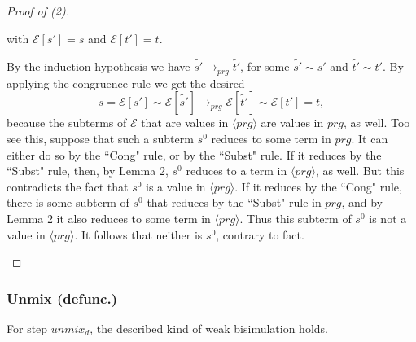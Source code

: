\documentclass[11pt]{article} %
\begin{document}
\begin{proof}[Proof of (2)]
\begin{enumerate}
with $\mathcal{E}[s'] = s$ and $\mathcal{E}[t'] = t$.

By the induction hypothesis we have $\widetilde{s'} \longrightarrow_{prg} \widetilde{t'}$, for some $\widetilde{s'} \sim s'$ and $\widetilde{t'} \sim t'$. By applying the congruence rule we get the desired
\begin{equation*}
s = \mathcal{E}[s'] \sim \mathcal{E}[\widetilde{s'}] \longrightarrow_{prg} \mathcal{E}[\widetilde{t'}] \sim \mathcal{E}[t'] = t,
\end{equation*}
because the subterms of $\mathcal{E}$ that are values in $\langle prg \rangle$ are values in $prg$, as well. Too see this, suppose that such a subterm $s^0$ reduces to some term in $prg$. It can either do so by the ``Cong" rule, or by the ``Subst" rule. If it reduces by the ``Subst" rule, then, by Lemma 2, $s^0$ reduces to a term in $\langle prg \rangle$, as well. But this contradicts the fact that $s^0$ is a value in $\langle prg \rangle$. If it reduces by the ``Cong" rule, there is some subterm of $s^0$ that reduces by the ``Subst" rule in $prg$, and by Lemma 2 it also reduces to some term in $\langle prg \rangle$. Thus this subterm of $s^0$ is not a value in $\langle prg \rangle$. It follows that neither is $s^0$, contrary to fact.

\end{enumerate}

\end{proof}

\subsubsection{Unmix (defunc.)}

For step $unmix_d$, the described kind of weak bisimulation holds.
\end{document}
